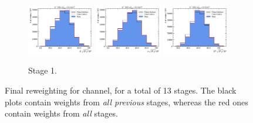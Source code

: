 \begin{figure}[htb]
    \begin{subfigure}{\textwidth}
        \centering
        \includegraphics[width=0.32\textwidth]{./figs-mc-correction/reweighting-final/plot_step0-Dst_iso-k_comp.pdf}
        \includegraphics[width=0.32\textwidth]{./figs-mc-correction/reweighting-final/plot_step0-Dst_iso-pi_comp.pdf}
        \includegraphics[width=0.32\textwidth]{./figs-mc-correction/reweighting-final/plot_step0-Dst_iso-d0_comp.pdf}
        \caption{Stage 1.}
    \end{subfigure}
    \caption{
        Final reweighting for \Dstar channel, for a total of 13 stages.
        The black plots contain weights from \emph{all previous} stages,
        whereas the red ones contain weights from \emph{all} stages.
    }
    \label{fig:final-rwt-dst-idx0}
\end{figure}


